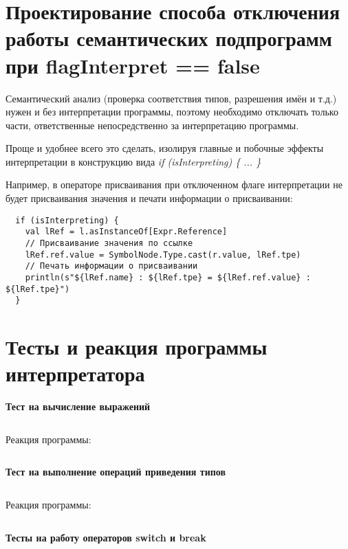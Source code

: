 \documentclass[a4paper,12pt]{article}
\begin{document}
\section{Проектирование способа отключения работы семантических подпрограмм при flagInterpret == false}
\begin{flushleft}
  \justify

Семантический анализ (проверка соответствия типов, разрешения имён и т.д.) нужен и без интерпретации программы, поэтому необходимо отключать только части, ответственные непосредственно за интерпретацию программы.

Проще и удобнее всего это сделать, изолируя главные и побочные эффекты интерпретации в конструкцию вида \textit{if (isInterpreting) \{ ... \}}


Например, в операторе присваивания при отключенном флаге интерпретации не будет присваивания значения и печати информации о присваивании:
\begin{verbatim}
  if (isInterpreting) {
    val lRef = l.asInstanceOf[Expr.Reference]
    // Присваивание значения по ссылке
    lRef.ref.value = SymbolNode.Type.cast(r.value, lRef.tpe)
    // Печать информации о присваивании
    println(s"${lRef.name} : ${lRef.tpe} = ${lRef.ref.value} : ${lRef.tpe}")
  }
\end{verbatim}
\end{flushleft}
\newpage
\section{Тесты и реакция программы интерпретатора}
\textbf{Тест на вычисление выражений}
\inputminted[breaklines,frame=lines,linenos]{java}{../src/test/fun-test/expressions/Correct.java}
Реакция программы:
\inputminted[breaklines,frame=lines,linenos]{text}{../src/test/fun-test/expressions/Correct.java.out}
\textbf{Тест на выполнение операций приведения типов}
\inputminted[breaklines,frame=lines,linenos]{java}{../src/test/fun-test/other/TypeCast.java}
Реакция программы:
\inputminted[breaklines,frame=lines,linenos]{text}{../src/test/fun-test/other/TypeCast.java.out}
\textbf{Тесты на работу операторов switch и break}
\end{document}

